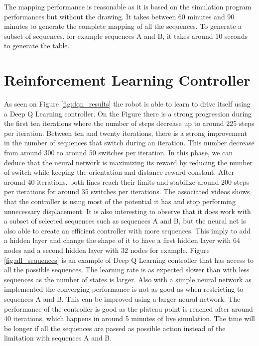         The mapping performance is reasonable as it is based on the simulation program performances but without the drawing. It takes between 60 minutes and 90 minutes to generate the complete mapping of all the sequences. To generate a subset of sequences, for example sequences A and B, it takes around 10 seconds to generate the table.
        
    \section{Reinforcement Learning Controller}
        As seen on Figure \ref{fig:dqn_results} the robot is able to learn to drive itself using a Deep Q Learning controller. On the Figure there is a strong progression during the first ten iterations where the number of steps decrease up to around 225 steps per iteration. Between ten and twenty iterations, there is a strong improvement in the number of sequences that switch during an iteration. This number decrease from around 300 to around 50 switches per iteration. In this phase, we can deduce that the neural network is maximizing its reward by reducing the number of switch while keeping the orientation and distance reward constant. After around 40 iterations, both lines reach their limits and stabilize around 200 steps per iterations for around 35 switches per iterations. The associated videos shows that the controller is using most of the potential it has and stop performing unnecessary displacement. It is also interesting to observe that it does work with a subset of selected sequences such as sequences A and B, but the neural net is also able to create an efficient controller with more sequences. This imply to add a hidden layer and change the shape of it to have a first hidden layer with 64 nodes and a second hidden layer with 32 nodes for example. Figure \ref{fig:all_sequences} is an example of Deep Q Learning controller that has access to all the possible sequences. The learning rate is as expected slower than with less sequences as the number of states is larger. Also with a simple neural network as implemented the converging performance is not as good as when restricting to sequences A and B. This can be improved using a larger neural network.
        The performance of the controller is good as the plateau point is reached after around 40 iterations, which happens in around 5 minutes of live simulation. The time will be longer if all the sequences are passed as possible action instead of the limitation with sequences A and B.
        